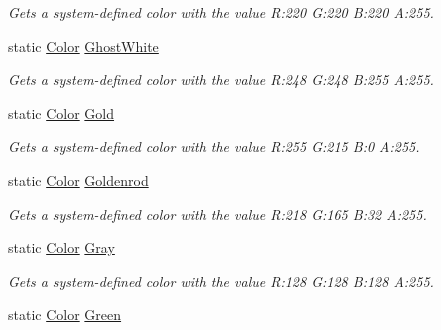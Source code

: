 \begin{DoxyCompactItemize}
\begin{DoxyCompactList}\small\item\em Gets a system-\/defined color with the value R\+:220 G\+:220 B\+:220 A\+:255.\end{DoxyCompactList}\item 
static \hyperlink{structMicrosoft_1_1Xna_1_1Framework_1_1Color}{Color} \hyperlink{structMicrosoft_1_1Xna_1_1Framework_1_1Color_a7e7f36952fc2c630bb0cef197a348e54}{Ghost\+White}
\begin{DoxyCompactList}\small\item\em Gets a system-\/defined color with the value R\+:248 G\+:248 B\+:255 A\+:255.\end{DoxyCompactList}\item 
static \hyperlink{structMicrosoft_1_1Xna_1_1Framework_1_1Color}{Color} \hyperlink{structMicrosoft_1_1Xna_1_1Framework_1_1Color_a76ff7ba14dac650100e7443037c66759}{Gold}
\begin{DoxyCompactList}\small\item\em Gets a system-\/defined color with the value R\+:255 G\+:215 B\+:0 A\+:255.\end{DoxyCompactList}\item 
static \hyperlink{structMicrosoft_1_1Xna_1_1Framework_1_1Color}{Color} \hyperlink{structMicrosoft_1_1Xna_1_1Framework_1_1Color_afd5a04aefaec58f43dcbe2cddd08bf01}{Goldenrod}
\begin{DoxyCompactList}\small\item\em Gets a system-\/defined color with the value R\+:218 G\+:165 B\+:32 A\+:255.\end{DoxyCompactList}\item 
static \hyperlink{structMicrosoft_1_1Xna_1_1Framework_1_1Color}{Color} \hyperlink{structMicrosoft_1_1Xna_1_1Framework_1_1Color_a9983e26e9f29a51ed8ebdc3625aefcb0}{Gray}
\begin{DoxyCompactList}\small\item\em Gets a system-\/defined color with the value R\+:128 G\+:128 B\+:128 A\+:255.\end{DoxyCompactList}\item 
static \hyperlink{structMicrosoft_1_1Xna_1_1Framework_1_1Color}{Color} \hyperlink{structMicrosoft_1_1Xna_1_1Framework_1_1Color_affd8ef719199de55ed9af635dd8eb209}{Green}

\end{DoxyCompactItemize}
